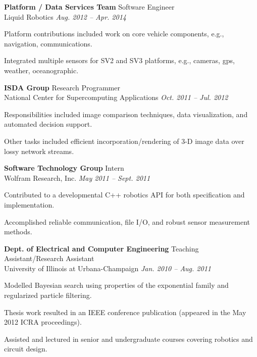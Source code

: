 \documentclass[margin, line]{resume}
\begin{document}
\begin{resume}
    \textbf{Platform / Data Services Team} \hfill Software Engineer\\  
    Liquid Robotics \hfill \textsl{Aug. 2012 -- Apr. 2014} \\
    \vspace{ -2 mm}
    \begin{list2}
        \item Platform contributions included work on core vehicle components, e.g., navigation, communications.
        \item Integrated multiple sensors for SV2 and SV3 platforms, e.g., cameras, gps, weather, oceanographic.
    \end{list2}\vspace{-2mm}

    \textbf{ISDA Group} \hfill Research Programmer\\  
    National Center for Supercomputing Applications \hfill \textsl{Oct. 2011 -- Jul. 2012} \\
    \vspace{ -2 mm}
    \begin{list2}
        \item Responsibilities included image comparison techniques, data visualization, and automated decision support. 
        \item Other tasks included efficient incorporation/rendering of 3-D image data over lossy network streams.  
    \end{list2}\vspace{-2mm}
   
    \textbf{Software Technology Group} \hfill Intern\\  
    Wolfram Research, Inc. \hfill \textsl{May 2011 -- Sept. 2011} \\
    \vspace{ -2 mm}
    \begin{list2}
        \item Contributed to a developmental C++ robotics API for both specification and implementation.
	 \item Accomplished reliable communication, file I/O, and robust sensor measurement methods. 
    \end{list2}\vspace{-2mm}

    \textbf{Dept. of Electrical and Computer Engineering} \hfill Teaching Assistant/Research Assistant \\  
    University of Illinois at Urbana-Champaign \hfill \textsl{Jan. 2010 -- Aug. 2011} \\
    \vspace{ -2 mm}
    \begin{list2}
        \item Modelled Bayesian search using properties of the exponential family and regularized particle filtering.
	 \item Thesis work resulted in an IEEE conference publication (appeared in the May 2012 ICRA proceedings).  
        \item Assisted and lectured in senior and undergraduate courses covering robotics and circuit design.
    \end{list2}\vspace{-2mm}


\end{resume}
\end{document}
